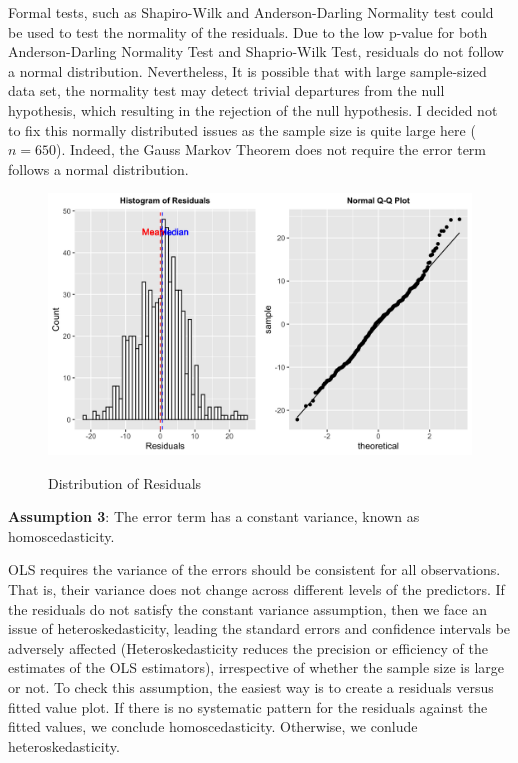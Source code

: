 \documentclass{article}
\begin{document}
Formal tests, such as Shapiro-Wilk and Anderson-Darling Normality test could be used to test the normality of the residuals. Due to the low p-value for both Anderson-Darling Normality Test and Shaprio-Wilk Test, residuals do not follow a normal distribution. Nevertheless, It is possible that with large sample-sized data set, the normality test may detect trivial departures from the null hypothesis, which resulting in the rejection of the null hypothesis. I decided not to fix this normally distributed issues as the sample size is quite large here ($n=650$). Indeed, the Gauss Markov Theorem does not require the error term follows a normal distribution.

\begin{figure}[htbp]
\begin{center}
\caption{Distribution of Residuals}
\includegraphics[scale=0.32]{residuals_check.png}
\label{fig:13}
\end{center}
\end{figure}

\textbf{Assumption 3}: The error term has a constant variance, known as homoscedasticity.

OLS requires the variance of the errors should be consistent for all observations. That is, their variance does not change across different levels of the predictors. If the residuals do not satisfy the constant variance assumption, then we face an issue of heteroskedasticity, leading the standard errors and confidence intervals be adversely affected (Heteroskedasticity reduces the precision or efficiency of the estimates of the OLS estimators), irrespective of whether the sample size is large or not. To check this assumption, the easiest way is to create a residuals versus fitted value plot. If there is no systematic pattern for the residuals against the fitted values, we conclude homoscedasticity. Otherwise, we conlude heteroskedasticity. 
\end{document}
